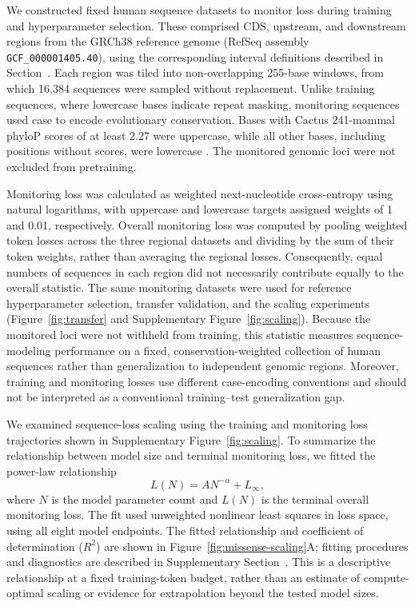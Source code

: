 \documentclass[a4paper,num-refs]{oup-contemporary}
\begin{document}
We constructed fixed human sequence datasets to monitor loss during
training and hyperparameter selection.
These comprised CDS, upstream, and downstream regions from the GRCh38
reference genome (RefSeq assembly \texttt{GCF\_000001405.40}),
using the corresponding interval definitions described in
Section~.
Each region was tiled into non-overlapping 255-base windows, from
which 16,384 sequences were sampled without replacement.
Unlike training sequences, where lowercase bases indicate repeat
masking, monitoring sequences used case to encode evolutionary
conservation. Bases with Cactus 241-mammal phyloP scores of at least
2.27 were uppercase, while all other bases, including positions
without scores, were lowercase
\citep{pollard2010phylop,marindnamonitoringcode,
marindnamonitoringcds,marindnamonitoringupstream,
marindnamonitoringdownstream}.
The monitored genomic loci were not excluded from pretraining.




Monitoring loss was calculated as weighted next-nucleotide
cross-entropy using natural logarithms, with uppercase and lowercase
targets assigned weights of 1 and 0.01, respectively.
Overall monitoring loss was computed by pooling weighted token losses
across the three regional datasets and dividing by the sum of their
token weights, rather than averaging the regional losses.
Consequently, equal numbers of sequences in each region did not
necessarily contribute equally to the overall statistic.
The same monitoring datasets were used for reference hyperparameter
selection, transfer validation, and the scaling experiments
(Figure~\ref{fig:transfer} and Supplementary Figure~\ref{fig:scaling}).
Because the monitored loci were not withheld from training, this
statistic measures sequence-modeling performance on a fixed,
conservation-weighted collection of human sequences rather than
generalization to independent genomic regions.
Moreover, training and monitoring losses use different case-encoding
conventions and should not be interpreted as a conventional
training--test generalization gap.

We examined sequence-loss scaling using the training and monitoring
loss trajectories shown in Supplementary Figure~\ref{fig:scaling}.
To summarize the relationship between model size and terminal
monitoring loss, we fitted the power-law relationship
\citep{kaplan2020scaling}
\[
L(N) = A N^{-\alpha} + L_{\infty},
\]
where $N$ is the model parameter count and $L(N)$ is the terminal
overall monitoring loss.
The fit used unweighted nonlinear least squares in loss space,
using all eight model endpoints.
The fitted relationship and coefficient of determination ($R^2$)
are shown in Figure~\ref{fig:missense-scaling}A; fitting procedures and
diagnostics are described in Supplementary
Section~.
This is a descriptive relationship at a fixed training-token budget,
rather than an estimate of compute-optimal scaling or evidence for
extrapolation beyond the tested model sizes.
\end{document}
